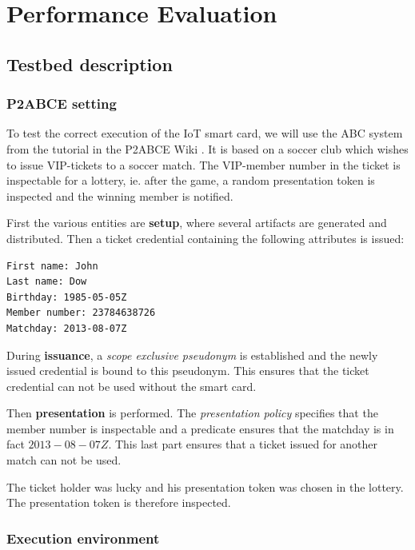 \section{Performance Evaluation}

\subsection{Testbed description}


\subsubsection{P2ABCE setting}

To test the correct execution of the IoT smart card, we will use the ABC system from the tutorial in the P2ABCE Wiki \citep{p2abcurlwiki}. It is based on a soccer club which wishes to issue VIP-tickets to a soccer match. The VIP-member number in the ticket is inspectable for a lottery, ie. after the game, a random presentation token is inspected and the winning member is notified.

First the various entities are \textbf{setup}, where several artifacts are generated and distributed. Then a ticket credential containing the following attributes is issued:

\begin{verbatim}
First name: John
Last name: Dow
Birthday: 1985-05-05Z
Member number: 23784638726
Matchday: 2013-08-07Z
\end{verbatim}

During \textbf{issuance}, a \textit{scope exclusive pseudonym} is established and the newly issued credential is bound to this pseudonym. This ensures that the ticket credential can not be used without the smart card.

Then \textbf{presentation} is performed. The \textit{presentation policy} specifies that the member number is inspectable and a predicate ensures that the matchday is in fact $2013-08-07Z$. This last part ensures that a ticket issued for another match can not be used.

The ticket holder was lucky and his presentation token was chosen in the lottery. The presentation token is therefore inspected.


\hfil

\subsubsection{Execution environment}


